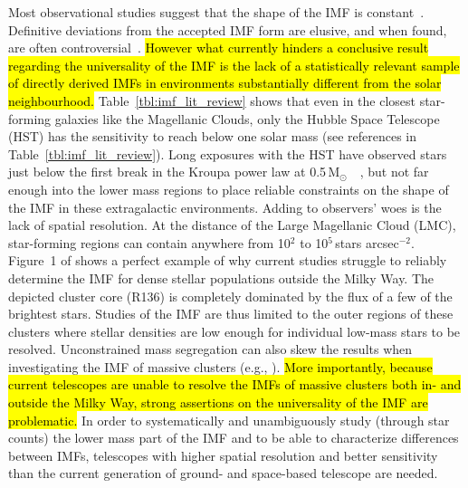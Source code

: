 \documentclass{aa}
\newcommand{\msun}{M$_\odot$~}
\newcommand{\h}[1]{$^{#1}$}
\newcommand{\spae}{stars arcsec$^{-2}$}
\begin{document}
Most observational studies suggest that the shape of the IMF is constant~\citep{Lada2003-ip,Kroupa2002,Bastian2010}.
Definitive deviations from the accepted IMF form are elusive, and when found, are often controversial~\citep{Van_Dokkum2010-gx,Conroy2012-hv,Drass2016-kp}.
\hl{However what currently hinders a conclusive result regarding the universality of the IMF is the lack of a statistically relevant sample of directly derived IMFs in environments substantially different from the solar neighbourhood.}
Table~\ref{tbl:imf_lit_review} shows that even in the closest star-forming galaxies like the Magellanic Clouds, only the Hubble Space Telescope (HST) has the sensitivity to reach below one solar mass (see references in Table~\ref{tbl:imf_lit_review}).
Long exposures with the HST have observed stars just below the first break in the Kroupa power law at 0.5\,\msun~\citep{dario2009,kalirai2013,geha2013}, but not far enough into the lower mass regions to place reliable constraints on the shape of the IMF in these extragalactic environments.
Adding to observers' woes is the lack of spatial resolution.
At the distance of the Large Magellanic Cloud (LMC), star-forming regions can contain anywhere from 10\h2 to 10\h5\,\spae.
Figure~1 of \citet{sirianni2000} shows a perfect example of why current studies struggle to reliably determine the IMF for dense stellar populations outside the Milky Way.
The depicted cluster core (R136) is completely dominated by the flux of a few of the brightest stars.
Studies of the IMF are thus limited to the outer regions of these clusters where stellar densities are low enough for individual low-mass stars to be resolved.
Unconstrained mass segregation can also skew the results when investigating the IMF of massive clusters (e.g., \citealt{Ascenso2009-de}).
\hl{More importantly, because current telescopes are unable to resolve the IMFs of massive clusters both in- and outside the Milky Way, strong assertions on the universality of the IMF are problematic.}
In order to systematically and unambiguously study (through star counts) the lower mass part of the IMF and to be able to characterize differences between IMFs, telescopes with higher spatial resolution and better sensitivity than the current generation of ground- and space-based telescope are needed.
\end{document}
